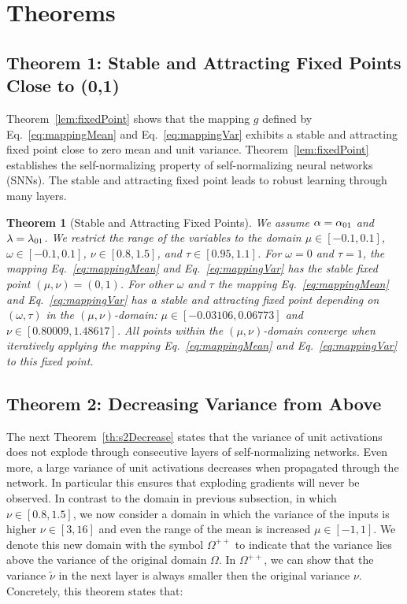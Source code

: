 \documentclass{article}
\newtheorem{theorem}{Theorem}
\newcommand\nunn{{\tilde \nu}}
\begin{document}
\section{Theorems}
\subsection{Theorem 1: Stable and Attracting Fixed Points Close to (0,1)}

Theorem~\ref{lem:fixedPoint}
shows that the mapping $g$ defined by Eq.~\eqref{eq:mappingMean}
and Eq.~\eqref{eq:mappingVar} 
exhibits a stable and attracting fixed point close to zero mean and
unit variance. 
Theorem~\ref{lem:fixedPoint} establishes the self-normalizing property of self-normalizing
neural networks (SNNs). The stable and
attracting fixed point leads to robust learning through many layers.

\begin{theorem}[Stable and Attracting Fixed Points]
We assume $\alpha = \alpha_{\rm 01}$ and $\lambda=\lambda_{\rm 01}$.
We restrict the range of the variables to the domain 
$\mu \in [-0.1,0.1]$,
$\omega \in [-0.1,0.1]$,
$\nu \in [0.8,1.5]$, and
$\tau \in [0.95,1.1]$.
For $\omega=0$ and $\tau=1$, the mapping  Eq.~\eqref{eq:mappingMean}
and Eq.~\eqref{eq:mappingVar} has the stable
fixed point $(\mu,\nu)=(0,1)$.
For other $\omega$ and $\tau$ the mapping  Eq.~\eqref{eq:mappingMean}
and Eq.~\eqref{eq:mappingVar}  has a stable and
attracting fixed point depending on $(\omega,\tau)$ in the 
$(\mu,\nu)$-domain: $\mu \in [-0.03106, 0.06773]$ and 
$\nu \in [0.80009,1.48617]$.
All points within the $(\mu,\nu)$-domain converge when
iteratively applying the mapping  Eq.~\eqref{eq:mappingMean}
and Eq.~\eqref{eq:mappingVar} to this fixed point.
\end{theorem}

\subsection{Theorem 2: Decreasing Variance from Above}
The next Theorem~\ref{th:s2Decrease} states 
that the variance of unit activations 
does not explode through
consecutive layers of self-normalizing networks.
Even more, a large variance of unit activations decreases when
propagated through the network. 
In particular this ensures that exploding gradients will never be
observed.
In contrast to the domain in previous subsection, 
in which $\nu \in [0.8, 1.5]$, we now consider a domain
in which the variance of the inputs is higher $\nu \in [3, 16]$ and even the 
range of the mean is increased $\mu \in[-1,1]$. We denote this new domain with 
the symbol $\Omega^{++}$ to indicate that the variance lies above the variance of the original domain $\Omega$.
In $\Omega^{++}$, we can show that the variance $\nunn$ in the next layer is always smaller 
then the original variance $\nu$.
Concretely, this theorem states that:
\end{document}
